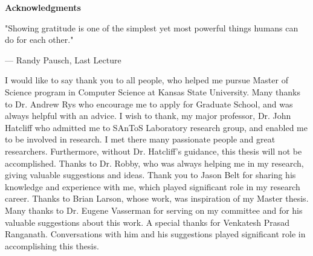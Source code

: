 
\newpage
\vspace*{0.9cm}
\begin{center}
{\bf \Huge Acknowledgments}
\end{center}

\setlength{\baselineskip}{0.8cm}

{}

\setlength{}
\setlength\epigraphrule{0pt}
\makeatletter
{}
\makeatother

\epigraph{"Showing gratitude is one of the simplest yet most powerful things humans can do for each other."}{--- \textup{Randy Pausch}, Last Lecture}


I would like to say thank you to all people, who helped me pursue Master of Science program in Computer Science at Kansas State University. Many thanks to Dr. Andrew Rys who encourage me to apply for Graduate School, and was always helpful with an advice. I wish to thank, my major professor, Dr. John Hatcliff who admitted me to SAnToS Laboratory research group, and enabled me to be involved in research. I met there many passionate people and great researchers. Furthermore, without Dr. Hatcliff's guidance, this thesis will not be accomplished. Thanks to Dr. Robby, who was always helping me in my research, giving valuable suggestions and ideas. Thank you to Jason Belt for sharing his knowledge and experience with me, which played significant role in my research career. Thanks to Brian Larson, whose work, was inspiration of my Master thesis. Many thanks to Dr. Eugene Vasserman for serving on my committee and for his valuable suggestions about this work. A special thanks for Venkatesh Prasad Ranganath. Conversations with him and his suggestions played significant role in accomplishing this thesis.
